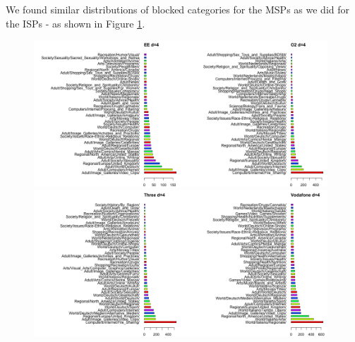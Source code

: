 \documentclass{bmcart}
\begin{document}
We found similar distributions of blocked categories for the MSPs as we did for the ISPs - as shown in Figure \ref{fig:mobile-blocked-categories}.

\begin{figure}[h!]
\caption{}
\includegraphics[width=0.49\textwidth]{imgs/EE-d-4-blocked-categories-to-date.png}\includegraphics[width=0.49\textwidth]{imgs/O2-d-4-blocked-categories-to-date.png}
\includegraphics[width=0.49\textwidth]{imgs/Three-d-4-blocked-categories-to-date.png}\includegraphics[width=0.49\textwidth]{imgs/Vodafone-d-4-blocked-categories-to-date.png}
\label{fig:mobile-blocked-categories}
\end{figure}
\end{document}
